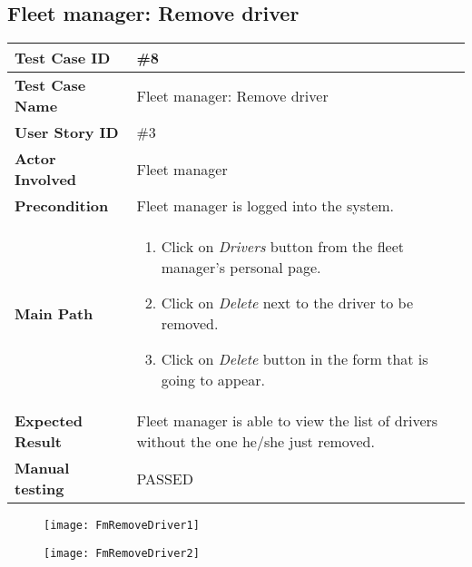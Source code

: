 \subsection{Fleet manager: Remove driver}
\begin{center}
	\begin{tabular} { | m{3.5cm} | m{9.5cm} | }
		\hline
		\textbf{Test Case ID} & \#8\\
		\hline
		\textbf{Test Case Name} & Fleet manager: Remove driver\\
		\hline
		\textbf{User Story ID} & \#3 \\
		\hline
		\textbf{Actor Involved} & Fleet manager\\
		\hline
		\textbf{Precondition} & Fleet manager is logged into the system.\\
		\hline
		\textbf{Main Path} & 
		\begin{enumerate}
			\item Click on \textit{Drivers} button from the fleet manager's personal page.
			\item Click on \textit{Delete} next to the driver to be removed.
			\item Click on \textit{Delete} button in the form that is going to appear.
		\end{enumerate}\\
		\hline
		\textbf{Expected Result} & Fleet manager is able to view the list of drivers without the one he/she just removed.\\
		\hline
	\textbf{Manual testing} & PASSED\\
	\hline
\end{tabular}
\end{center}
\begin{figure}[H]
\centering
\texttt{[image: FmRemoveDriver1]}
\end{figure}
\begin{figure}[H]
\centering
\texttt{[image: FmRemoveDriver2]}
\end{figure}
\newpage
